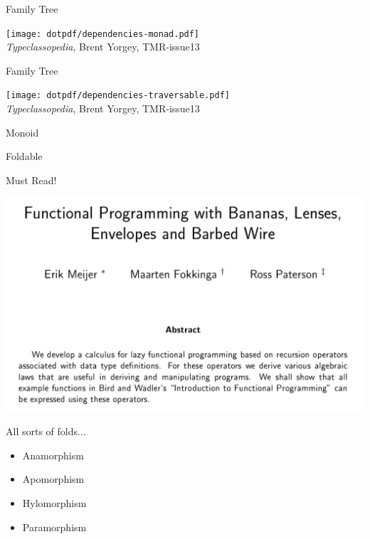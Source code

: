 \documentclass[14pt,t,usepdftitle=false,xcolornames=x11names,svgnames,dvipsnames,usenames]{beamer}
\newcommand{\lmss}{\fontfamily{lmtt}\selectfont\small}
\newcommand{\includelisting}[1]{
  {\lmss}}
\begin{document}
\begin{frame}{Family Tree}
  \vspace{-7mm}
  \begin{center}
    \texttt{[image: dotpdf/dependencies-monad.pdf]}\\
    \tiny{\emph{Typeclassopedia}, Brent Yorgey, TMR-issue13}
  \end{center}
\end{frame}

\begin{frame}{Family Tree}
  \vspace{-7mm}
  \begin{center}
    \texttt{[image: dotpdf/dependencies-traversable.pdf]}\\
    \tiny{\emph{Typeclassopedia}, Brent Yorgey, TMR-issue13}
  \end{center}
\end{frame}

\begin{frame}{Monoid}
  \includelisting{texsrc/Monoid.hs.tex}
\end{frame}

\begin{frame}{Foldable}
  \includelisting{texsrc/Foldable.hs.tex}
\end{frame}

\begin{frame}{Must Read!}
  \begin{center}
    \includegraphics[scale=.7]{images/Catamorphisms.png}
  \end{center}
\end{frame}

\begin{frame}{All sorts of folds...}
\begin{itemize}[<+->]
  \item Anamorphism
  \item Apomorphism
  \item Hylomorphism
  \item Paramorphism
\end{itemize}
\end{frame}
\end{document}
